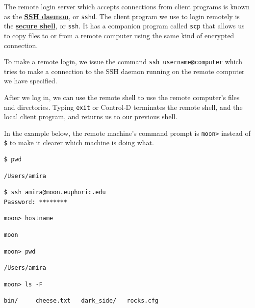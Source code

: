 \documentclass[
]{krantz}
\newcommand{\gref}[2]{\hyperlink{#2}{\textbf{#1}}}
\begin{document}
The remote login server which accepts connections from client programs
is known as the \gref{SSH daemon}{ssh\_daemon}, or \texttt{sshd}.
The client program we use to login remotely is the \gref{secure shell}{ssh\_glossary},
or \texttt{ssh}.
It has a companion program called \texttt{scp}
that allows us to copy files to or from a remote computer using the same kind of encrypted connection.

To make a remote login, we issue the command \texttt{ssh\ username@computer}
which tries to make a connection to the SSH daemon running on the remote computer we have specified.

After we log in,
we can use the remote shell to use the remote computer's files and directories.
Typing \texttt{exit} or Control-D
terminates the remote shell, and the local client program, and returns us to our previous shell.

In the example below,
the remote machine's command prompt is \texttt{moon\textgreater{}}
instead of \texttt{\$} to make it clearer which machine is doing what.

\begin{verbatim}
$ pwd
\end{verbatim}

\begin{verbatim}
/Users/amira
\end{verbatim}

\begin{verbatim}
$ ssh amira@moon.euphoric.edu
Password: ********
\end{verbatim}

\begin{verbatim}
moon> hostname
\end{verbatim}

\begin{verbatim}
moon
\end{verbatim}

\begin{verbatim}
moon> pwd
\end{verbatim}

\begin{verbatim}
/Users/amira
\end{verbatim}

\begin{verbatim}
moon> ls -F
\end{verbatim}

\begin{verbatim}
bin/     cheese.txt   dark_side/   rocks.cfg
\end{verbatim}
\end{document}
